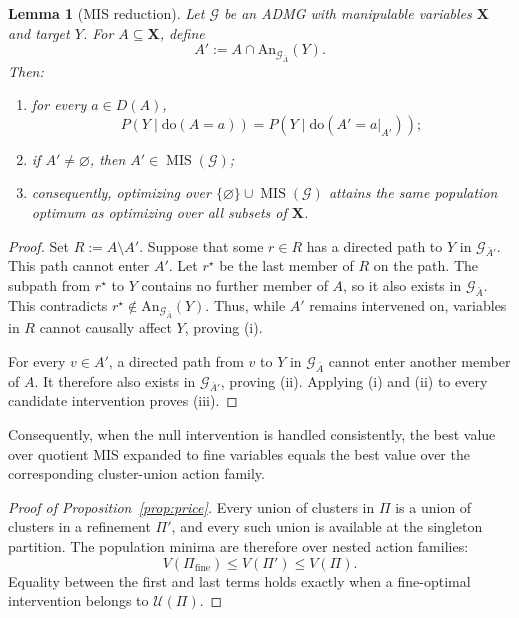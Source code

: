\documentclass[twoside]{article}
\newtheorem{lemma}{Lemma}
\newcommand{\doo}{\mathrm{do}}
\newcommand{\An}{\mathrm{An}}
\begin{document}
\begin{lemma}[MIS reduction]
\label{lem:mis-reduction}
Let \(\mathcal G\) be an ADMG with manipulable variables \(\mathbf X\) and target \(Y\). For \(A\subseteq\mathbf X\), define
\[
 A':=A\cap\An_{\mathcal G_{\bar A}}(Y).
\]
Then:
\begin{enumerate}[label=(\roman*)]
 \item for every \(a\in D(A)\),
 \[
  P(Y\mid\doo(A=a))
  =P\!\left(Y\mid\doo(A'=a|_{A'})\right);
 \]
\item if \(A'\ne\varnothing\), then \(A'\in\operatorname{MIS}(\mathcal G)\); \item consequently, optimizing over \(\{\varnothing\}\cup\operatorname{MIS}(\mathcal G)\) attains the same population optimum as optimizing over all subsets of \(\mathbf X\).
\end{enumerate}
\end{lemma}

\begin{proof}
Set \(R:=A\setminus A'\). Suppose that some \(r\in R\) has a directed path to \(Y\) in \(\mathcal G_{\bar A'}\). This path cannot enter \(A'\). Let \(r^\star\) be the last member of \(R\) on the path. The subpath from \(r^\star\) to \(Y\) contains no further member of \(A\), so it also exists in \(\mathcal G_{\bar A}\). This contradicts \(r^\star\notin\An_{\mathcal G_{\bar A}}(Y)\). Thus, while \(A'\) remains intervened on, variables in \(R\) cannot causally affect \(Y\), proving (i).

For every \(v\in A'\), a directed path from \(v\) to \(Y\) in \(\mathcal G_{\bar A}\) cannot enter another member of \(A\). It therefore also exists in \(\mathcal G_{\bar A'}\), proving (ii). Applying (i) and (ii) to every candidate intervention proves (iii).
\end{proof}

Consequently, when the null intervention is handled consistently, the best value over quotient MIS expanded to fine variables equals the best value over the corresponding cluster-union action family.

\begin{proof}[Proof of Proposition~\ref{prop:price}]
Every union of clusters in \(\Pi\) is a union of clusters in a refinement \(\Pi'\), and every such union is available at the singleton partition. The population minima are therefore over nested action families:
\[
 V(\Pi_{\mathrm{fine}})\le V(\Pi')\le V(\Pi).
\]
Equality between the first and last terms holds exactly when a fine-optimal intervention belongs to \(\mathcal U(\Pi)\).
\end{proof}
\end{document}
